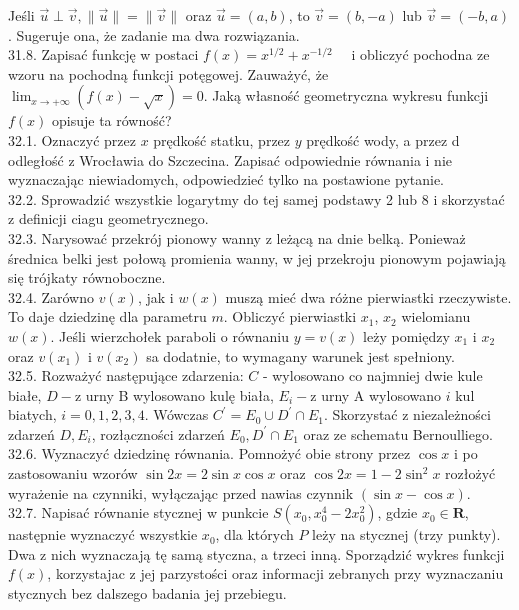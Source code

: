 \documentclass[10pt]{article}
\begin{document}
Jeśli $\vec{u} \perp \vec{v},\|\vec{u}\|=\|\vec{v}\|$ oraz $\vec{u}=(a, b)$, to $\vec{v}=(b,-a)$ lub $\vec{v}=(-b, a)$. Sugeruje ona, że zadanie ma dwa rozwiązania.\\
31.8. Zapisać funkcję w postaci $f(x)=x^{1 / 2}+x^{-1 / 2} \quad$ i obliczyć pochodna ze wzoru na pochodną funkcji potęgowej. Zauważyć, że $\lim _{x \rightarrow+\infty}(f(x)-\sqrt{x})=0$. Jaką własność geometryczna wykresu funkcji $f(x)$ opisuje ta równość?\\
32.1. Oznaczyć przez $x$ prędkość statku, przez $y$ prędkość wody, a przez d odległość z Wrocławia do Szczecina. Zapisać odpowiednie równania i nie wyznaczając niewiadomych, odpowiedzieć tylko na postawione pytanie.\\
32.2. Sprowadzić wszystkie logarytmy do tej samej podstawy 2 lub 8 i skorzystać z definicji ciagu geometrycznego.\\
32.3. Narysować przekrój pionowy wanny z leżącą na dnie belką. Ponieważ średnica belki jest połową promienia wanny, w jej przekroju pionowym pojawiają się trójkaty równoboczne.\\
32.4. Zarówno $v(x)$, jak i $w(x)$ muszą mieć dwa różne pierwiastki rzeczywiste. To daje dziedzinę dla parametru $m$. Obliczyć pierwiastki $x_{1}$, $x_{2}$ wielomianu $w(x)$. Jeśli wierzchołek paraboli o równaniu $y=v(x)$ leży pomiędzy $x_{1}$ i $x_{2}$ oraz $v\left(x_{1}\right)$ i $v\left(x_{2}\right)$ sa dodatnie, to wymagany warunek jest spełniony.\\
32.5. Rozważyć następujące zdarzenia: $C$ - wylosowano co najmniej dwie kule białe, $D-\mathrm{z}$ urny B wylosowano kulę biała, $E_{i}-\mathrm{z}$ urny A wylosowano $i$ kul biatych, $i=0,1,2,3,4$. Wówczas $C^{\prime}=E_{0} \cup D^{\prime} \cap E_{1}$. Skorzystać z niezależności zdarzeń $D, E_{i}$, rozłạczności zdarzeń $E_{0}, D^{\prime} \cap E_{1}$ oraz ze schematu Bernoulliego.\\
32.6. Wyznaczyć dziedzinę równania. Pomnożyć obie strony przez $\cos x$ i po zastosowaniu wzorów $\sin 2 x=2 \sin x \cos x$ oraz $\cos 2 x=1-2 \sin ^{2} x$ rozłożyć wyrażenie na czynniki, wyłączając przed nawias czynnik $(\sin x-\cos x)$.\\
32.7. Napisać równanie stycznej w punkcie $S\left(x_{0}, x_{0}^{4}-2 x_{0}^{2}\right)$, gdzie $x_{0} \in \mathbf{R}$, następnie wyznaczyć wszystkie $x_{0}$, dla których $P$ leży na stycznej (trzy punkty). Dwa z nich wyznaczają tę samą styczna, a trzeci inną. Sporządzić wykres funkcji $f(x)$, korzystajac z jej parzystości oraz informacji zebranych przy wyznaczaniu stycznych bez dalszego badania jej przebiegu.\\
\end{document}
